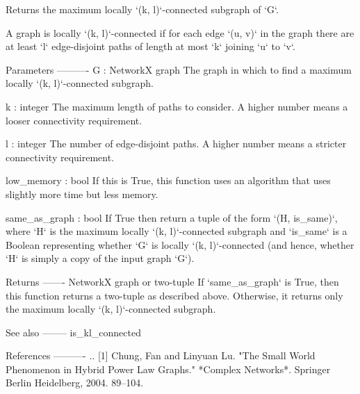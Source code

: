 \begin{DoxyVerb}Returns the maximum locally `(k, l)`-connected subgraph of `G`.

A graph is locally `(k, l)`-connected if for each edge `(u, v)` in the
graph there are at least `l` edge-disjoint paths of length at most `k`
joining `u` to `v`.

Parameters
----------
G : NetworkX graph
    The graph in which to find a maximum locally `(k, l)`-connected
    subgraph.

k : integer
    The maximum length of paths to consider. A higher number means a looser
    connectivity requirement.

l : integer
    The number of edge-disjoint paths. A higher number means a stricter
    connectivity requirement.

low_memory : bool
    If this is True, this function uses an algorithm that uses slightly
    more time but less memory.

same_as_graph : bool
    If True then return a tuple of the form `(H, is_same)`,
    where `H` is the maximum locally `(k, l)`-connected subgraph and
    `is_same` is a Boolean representing whether `G` is locally `(k,
    l)`-connected (and hence, whether `H` is simply a copy of the input
    graph `G`).

Returns
-------
NetworkX graph or two-tuple
    If `same_as_graph` is True, then this function returns a
    two-tuple as described above. Otherwise, it returns only the maximum
    locally `(k, l)`-connected subgraph.

See also
--------
is_kl_connected

References
----------
.. [1] Chung, Fan and Linyuan Lu. "The Small World Phenomenon in Hybrid
       Power Law Graphs." *Complex Networks*. Springer Berlin Heidelberg,
       2004. 89--104.\end{DoxyVerb}
 